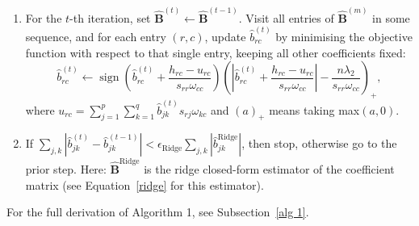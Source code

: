 \documentclass[11pt]{report} %
\begin{document}
\begin{enumerate}

\item  For the \( t \)-th iteration, set \( \hat{\mathbf{B}}^{(t)} \leftarrow \hat{\mathbf{B}}^{(t-1)} \). Visit all entries of \( \hat{\mathbf{B}}^{(m)} \) in some sequence, and for each entry \( (r, c) \), update \( \hat{b}^{(t)}_{rc} \) by minimising the objective function with respect to that single entry, keeping all other coefficients fixed:
\[
\hat{b}^{(t)}_{rc} \leftarrow \operatorname{sign} \left( \hat{b}^{(t)}_{rc} + \frac{h_{rc} - u_{rc}}{s_{rr} \omega_{cc}} \right) 
\left( \left| \hat{b}^{(t)}_{rc} + \frac{h_{rc} - u_{rc}}{s_{rr} \omega_{cc}} \right| - \frac{n \lambda_2}{s_{rr} \omega_{cc}} \right)_{+},
\]
where $u_{rc} = \sum_{j=1}^{p} \sum_{k=1}^{q} \hat{b}^{(t)}_{jk} s_{rj} \omega_{kc}$ and $(a)_+$ means taking max$(a,0)$. 

\item If $\sum_{j,k} \left| \hat{b}^{(t)}_{jk} - \hat{b}^{(t-1)}_{jk} \right| < \epsilon_\text{Ridge} \sum_{j,k} \left| \hat{b}^{\text{Ridge}}_{jk} \right|$,
then stop, otherwise go to the prior step. Here: $\hat{\mathbf{B}}^{\text{Ridge}}$ is the ridge closed-form estimator of the coefficient matrix (see Equation~\ref{ridge} for this estimator).
\end{enumerate}
\noindent For the full derivation of Algorithm 1, see Subsection~\ref{alg 1}.

\end{document}
